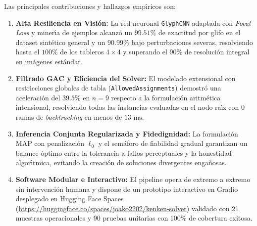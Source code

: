 \documentclass[conference]{IEEEtran}
\begin{document}
Las principales contribuciones y hallazgos emp\'{\i}ricos son:
\begin{enumerate}
    \item \textbf{Alta Resiliencia en Visi\'on:} La red neuronal \texttt{GlyphCNN} adaptada con \textit{Focal Loss} y miner\'{\i}a de ejemplos alcanz\'o un $99.51\%$ de exactitud por glifo en el dataset sint\'etico general y un $90.99\%$ bajo perturbaciones severas, resolviendo hasta el $100\%$ de los tableros $4\times4$ y superando el $90\%$ de resoluci\'on integral en im\'agenes est\'andar.
    \item \textbf{Filtrado GAC y Eficiencia del Solver:} El modelado extensional con restricciones globales de tabla (\texttt{AllowedAssignments}) demostr\'o una aceleraci\'on del $39.5\%$ en $n=9$ respecto a la formulaci\'on aritm\'etica intensional, resolviendo todas las instancias evaluadas en el nodo ra\'{\i}z con 0 ramas de \textit{backtracking} en menos de $13\text{ ms}$.
    \item \textbf{Inferencia Conjunta Regularizada y Fidedignidad:} La formulaci\'on MAP con penalizaci\'on $\ell_0$ y el sem\'aforo de fiabilidad gradual garantizan un balance \'optimo entre la tolerancia a fallos perceptuales y la honestidad algor\'{\i}tmica, evitando la creaci\'on de soluciones divergentes enga\~nosas.
    \item \textbf{Software Modular e Interactivo:} El pipeline opera de extremo a extremo sin intervenci\'on humana y dispone de un prototipo interactivo en Gradio desplegado en Hugging Face Spaces (\url{https://huggingface.co/spaces/joako2202/kenken-solver}) validado con 21 muestras operacionales y 90 pruebas unitarias con 100\% de cobertura exitosa.
\end{enumerate}



\end{document}

